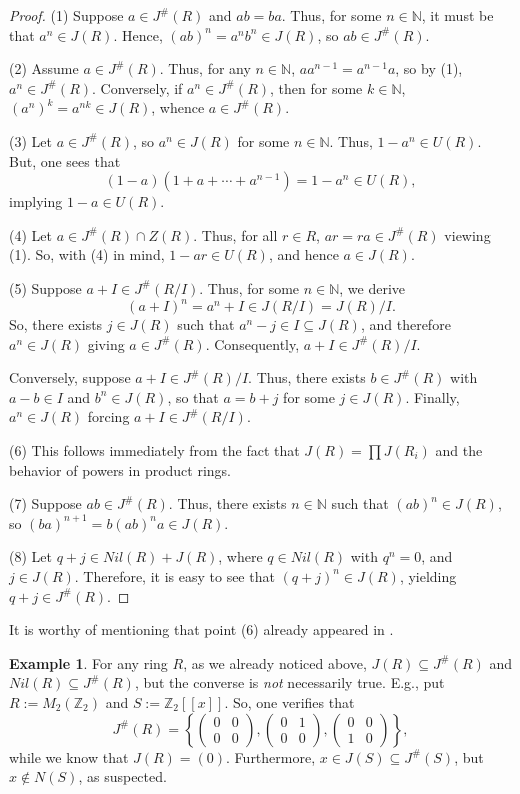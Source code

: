 \documentclass[12pt]{amsart}
\theoremstyle{definition}
\newtheorem{example}[theorem]{Example}
\begin{document}
\begin{proof}
(1) Suppose $a \in J^{\#}(R)$ and $ab = ba$. Thus, for some $n \in \mathbb{N}$, it must be that $a^n \in J(R)$. Hence, $(ab)^n = a^n b^n \in J(R)$, so $ab \in J^{\#}(R)$.
		
(2) Assume $a \in J^{\#}(R)$. Thus, for any $n \in \mathbb{N}$, $aa^{n-1} = a^{n-1}a$, so by (1), $a^n \in J^{\#}(R)$. Conversely, if $a^n \in J^{\#}(R)$, then for some $k \in \mathbb{N}$, $(a^n)^k = a^{nk} \in J(R)$, whence $a \in J^{\#}(R)$.
		
(3) Let $a \in J^{\#}(R)$, so $a^n \in J(R)$ for some $n \in \mathbb{N}$. Thus, $1 - a^n \in U(R)$. But, one sees that
\[
		(1 - a)(1 + a + \cdots + a^{n-1}) = 1 - a^n \in U(R),
\]
implying $1 - a \in U(R)$.
		
(4) Let $a \in J^{\#}(R) \cap Z(R)$. Thus, for all $r \in R$, $ar = ra \in J^{\#}(R)$ viewing (1). So, with (4) in mind, $1 - ar \in U(R)$, and hence $a \in J(R)$.
		
(5) Suppose $a + I \in J^{\#}(R/I)$. Thus, for some $n \in \mathbb{N}$, we derive
\[
		(a + I)^n = a^n + I \in J(R/I) = J(R)/I.
\]
So, there exists $j \in J(R)$ such that $a^n - j \in I \subseteq J(R)$, and therefore $a^n \in J(R)$ giving $a \in J^{\#}(R)$. Consequently, $a + I \in J^{\#}(R)/I$.
		
Conversely, suppose $a + I \in J^{\#}(R)/I$. Thus, there exists $b \in J^{\#}(R)$ with $a - b \in I$ and $b^n \in J(R)$, so that $a = b + j$ for some $j \in J(R)$. Finally, $a^n \in J(R)$ forcing $a + I \in J^{\#}(R/I)$.
		
(6) This follows immediately from the fact that $J(R) = \prod J(R_i)$ and the behavior of powers in product rings.

(7) Suppose $ab\in J^{\#}(R)$. Thus, there exists $n\in \mathbb{N}$ such that $(ab)^n\in J(R)$, so $(ba)^{n+1}=b(ab)^na\in J(R)$.

(8) Let $q + j \in Nil(R) + J(R)$, where $q \in Nil(R)$ with $q^n = 0$, and $j \in J(R)$. Therefore, it is easy to see that $(q + j)^n \in J(R)$, yielding $q + j \in J^{\#}(R)$.
\end{proof}

It is worthy of mentioning that point (6) already appeared in \cite{SU}.

\begin{example}\label{1.3}
For any ring $R$, as we already noticed above, \( J(R) \subseteq J^\#(R) \) and \( Nil(R) \subseteq J^\#(R) \), but the converse is {\it not} necessarily true. E.g., put \(R:=M_2(\mathbb{Z}_2) \) and \( S:=\mathbb{Z}_2[[x]] \). So, one verifies that
\[J^{\#}(R) = \left\{
\begin{pmatrix}
	0 & 0 \\
	0 & 0
\end{pmatrix},
\begin{pmatrix}
	0 & 1 \\
	0 & 0
\end{pmatrix},
\begin{pmatrix}
	0 & 0 \\
	1 & 0
\end{pmatrix}
\right\}
,\]
while we know that $J(R)=(0)$. Furthermore, \(x \in J(S) \subseteq J^\#(S) \), but \( x \notin N(S) \), as suspected.
\end{example}
\end{document}

